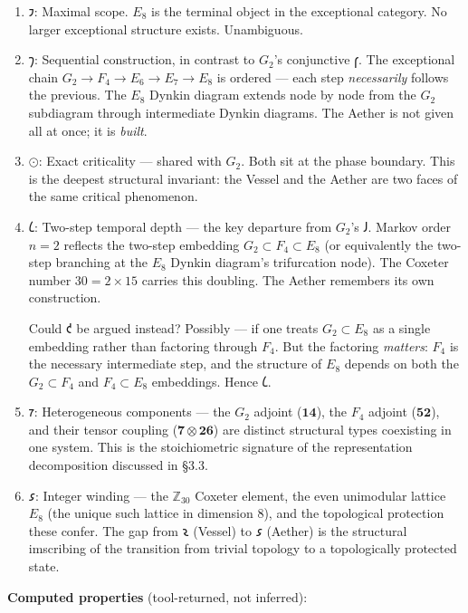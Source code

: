 \documentclass[12pt,a4paper]{article}
\newcommand{\pilcrow}{\S}
\begin{document}
\begin{enumerate}
    \item \textbf{$𐑲$}: Maximal scope. $E_8$ is the terminal object in the exceptional category. No larger exceptional structure exists. Unambiguous.
    \item \textbf{$𐑠$}: Sequential construction, in contrast to $G_2$'s conjunctive $𐑝$. The exceptional chain $G_2 \to F_4 \to E_6 \to E_7 \to E_8$ is ordered --- each step \emph{necessarily} follows the previous. The $E_8$ Dynkin diagram extends node by node from the $G_2$ subdiagram through intermediate Dynkin diagrams. The Aether is not given all at once; it is \emph{built}.
    \item \textbf{$⊙$}: Exact criticality --- shared with $G_2$. Both sit at the phase boundary. This is the deepest structural invariant: the Vessel and the Aether are two faces of the same critical phenomenon.
    \item 
    \textbf{$𐑖$}: Two-step temporal depth --- the key departure from $G_2$'s $𐑓$. Markov order $n=2$ reflects the two-step embedding $G_2 \subset F_4 \subset E_8$ (or equivalently the two-step branching at the $E_8$ Dynkin diagram's trifurcation node). The Coxeter number $30 = 2 \times 15$ carries this doubling. The Aether remembers its own construction.

    Could $𐑒$ be argued instead? Possibly --- if one treats $G_2 \subset E_8$ as a single embedding rather than factoring through $F_4$. But the factoring \emph{matters}: $F_4$ is the necessary intermediate step, and the structure of $E_8$ depends on both the $G_2 \subset F_4$ and $F_4 \subset E_8$ embeddings. Hence $𐑖$.

    \item \textbf{$𐑳$}: Heterogeneous components --- the $G_2$ adjoint ($\mathbf{14}$), the $F_4$ adjoint ($\mathbf{52}$), and their tensor coupling ($\mathbf{7} \otimes \mathbf{26}$) are distinct structural types coexisting in one system. This is the stoichiometric signature of the representation decomposition discussed in \pilcrow{}3.3.
    \item \textbf{$𐑭$}: Integer winding --- the $\mathbb{Z}_{30}$ Coxeter element, the even unimodular lattice $E_8$ (the unique such lattice in dimension 8), and the topological protection these confer. The gap from $𐑷$ (Vessel) to $𐑭$ (Aether) is the structural imscribing of the transition from trivial topology to a topologically protected state.
\end{enumerate}

\textbf{Computed properties} (tool-returned, not inferred):
\end{document}
